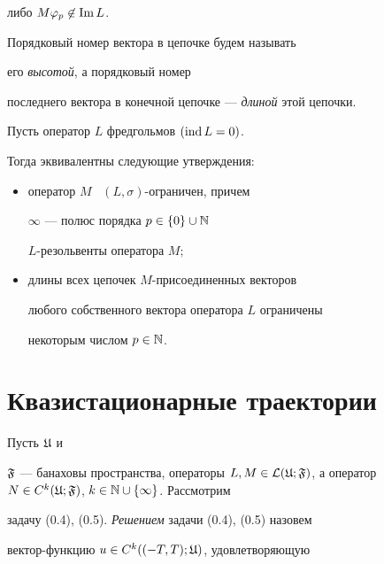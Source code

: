либо $M \varphi_p \not\in \operatorname{Im} L$.


Порядковый номер вектора в цепочке будем называть 


его {\it высотой}, а порядковый номер


последнего вектора в конечной цепочке --- {\it длиной} этой цепочки.





\begin{thms}


Пусть оператор $L$ фредгольмов $(\operatorname{ind} L = 0)$.


Тогда эквивалентны следующие утверждения\/${:}$


\begin{itemize}


\item[(i)] оператор $M$ \ $(L, \sigma )$-ограничен, причем


$\infty$ --- полюс порядка $p \in \{ 0 \} \cup {\Bbb N}$


$L$-резольвенты оператора $M;$


\item[(ii)] длины всех цепочек $M$-присоединенных векторов


любого собственного вектора оператора $L$ ограничены


некоторым числом $p \in {\Bbb N}$.


\end{itemize}


\end{thms}





\section{Квазистационарные траектории}





Пусть ${\frak U}$ и


${\frak F}$ --- банаховы пространства, операторы $L, M\in


{\cal L}({\frak U}; {\frak F})$, а оператор $N \in C^k( {\frak


U}; {\frak F} )$, $k \in {\Bbb N} \cup \{ \infty \}$. Рассмотрим


задачу (0.4), (0.5). {\it Решением} задачи (0.4), (0.5) назовем


вектор-функцию $u \in C^k((-T, T); {\frak U})$, удовлетворяющую


